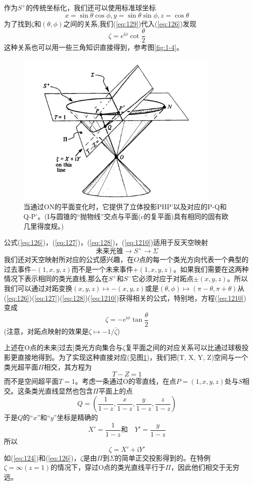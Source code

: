 \documentclass[utf8]{ctexbook}
\numberwithin{equation}{section}
\begin{document}
作为$S^+$的传统坐标化，我们还可以使用标准球坐标
\begin{equation}
    x= \sin \theta\cos \phi,y= \sin\theta\sin\phi, z=\cos\theta\label{eq:129}
\end{equation}
为了找到\(\zeta\)和$(\theta,\phi)$之间的关系,我们(\ref{eq:129})代入(\ref{eq:126})发现
\begin{equation}
    \zeta=e^{\mathrm{i}\phi} \cot \frac{\theta}{2}\label{eq:1210}
\end{equation}
这种关系也可以用一些三角知识直接得到，参考图\ref{fig:1-4}。
\begin{figure}
    \centering
    \includegraphics[width=10cm]{fig1-5.png}
    \caption{当通过ON的平面变化时，它提供了立体投影PHP'以及对应的P-Q和Q-P'。(I与圆锥的“抛物线”交点与平面(c的复平面)具有相同的固有欧几里得度规。)}\label{fig:1-5}
\end{figure}
公式(\ref{eq:126})，(\ref{eq:127})，(\ref{eq:128})，(\ref{eq:1210})适用于反天空映射
\[\text{未来光锥}\rightarrow S^+\rightarrow\Sigma\]
我们还对天空映射所对应的公式感兴趣，在$O$点的每一个类光方向代表一个典型的过去事件$-(1,x, y, z)$而不是一个未来事件$+ (1,x, y, z)$。如果我们需要在这两种情况下表示相同的类光直线,那么在$S^+$和$S^-$它必须对应于对跖点$\pm (x, y, z)$。所以我们可以通过对跖变换$(x, y, z)\mapsto-(x, y, z)$或是$(\theta,\phi )\mapsto(\pi-\theta,\pi+\theta )$从(\ref{eq:126})(\ref{eq:127})(\ref{eq:128})(\ref{eq:1210})获得相关的公式，特别地，方程(\ref{eq:1210})变成
\begin{equation}
    \zeta=-e^{\mathrm{i}\phi} \tan \frac{\theta}{2}\label{eq:1211}
\end{equation}
(注意，对跖点映射的效果是$\zeta\mapsto-1/\bar{\zeta} $)

上述在O点的未来[过去]类光方向集合与$\zeta$复平面之间的对应关系可以比通过球极投影更直接地得到。为了实现这种直接对应(见图\ref{fig:1-5})，我们把(T, X, Y, Z)空间与一个类光超平面$\Pi$相交，其方程为
\begin{equation}
    T-Z = 1
\end{equation}
而不是空间超平面$T = 1$。考虑一条通过O的零直线，在点$P= (1, x, y, z)$处与$S$相交。这条类光直线显然也包含$\Pi$平面上的点
\[Q=(\frac{1}{1-z},\frac{x}{1-z},\frac{y}{1-z},\frac{z}{1-z})\]
于是$Q$的“$x$”和“$y$”坐标是精确的
\[X'=\frac{1}{1-z}\text{和}\quad Y'=\frac{y}{1-z}\]
所以
\[\zeta=X'+\mathrm{i}Y'\]
如(\ref{eq:124})和(\ref{eq:126})，$\zeta$是由$\Pi$到$\Sigma$的简单正交投影得到的。在特例$\zeta=\infty (z=1)$的情况下，穿过O点的类光直线平行于$\Pi$，因此他们相交于无穷远。
\end{document}
